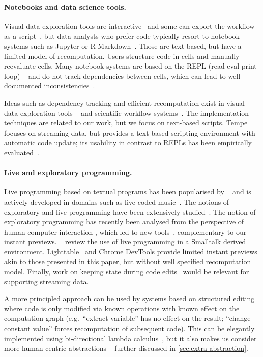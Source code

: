 \documentclass[english,crc,references=cleveref]{programming}
\theoremstyle{plain}
\theoremstyle{definition}
\begin{document}
\paragraph{Notebooks and data science tools.}
Visual data exploration tools are interactive~\cite{control,tableau,vizdom} and some
can export the workflow as a script~\cite{wrangler}, but data analysts who prefer code
typically resort to notebook systems such as Jupyter or R Markdown~\cite{jupyter,rmarkdown}.
Those are text-based, but have a limited model of recomputation. Users structure code in
cells and manually reevaluate cells. Many notebook systems are based on the REPL (read-eval-print-loop)%
~\cite{lisp,drscheme} and do not track dependencies between cells, which can lead to well-documented
inconsistencies~\cite{dataflow,noworkflow,wrattler}.

Ideas such as dependency tracking and efficient recomputation exist in visual data exploration tools%
~\cite{control,tableau,vizdom} and scientific workflow systems~\cite{taverna,kepler}. The
implementation techniques are related to our work, but we focus on text-based scripts.
Tempe~\cite{tempe} focuses on streaming data, but provides a text-based scripting environment
with automatic code update; its usability in contrast to REPLs has been empirically
evaluated~\cite{ripple}.

\paragraph{Live and exploratory programming.}
Live programming based on textual programs has been popularised by \citeauthor{learnable}~\cite{learnable,principle} and
is actively developed in domains such as live coded music~\cite{beyond,sonic}.
The notions of exploratory and live programming have been extensively studied~\cite{review}.
The notion of exploratory programming has recently been analysed from the perspective of
human-computer interaction \cite{exploratory}, which led to new tools~\cite{variolite},
complementary to our instant previews. ~\cite{liveroad}
review the use of live programming in a Smalltalk derived environment. Lighttable~\cite{lighttable}
and Chrome DevTools provide limited instant previews akin to those presented in this paper,
but without well specified recomputation model. Finally, work on keeping state during
code edits~\cite{alive,livingit} would be relevant for supporting streaming data.

A more principled approach can be used by systems based on structured editing~\cite{structure-based,interactive,livenut,lamdu}
where code is only modified via known operations with known effect on the computation graph
(e.\hairspace g.~``extract variable'' has no effect on the result; ``change constant value''
forces recomputation of subsequent code). This can be elegantly implemented using bi-directional
lambda calculus~\cite{hazelnut}, but it also makes us consider more human-centric abstractions%
~\cite{subtext,directprog} further discussed in \cref{sec:extra-abstraction}.
\end{document}
